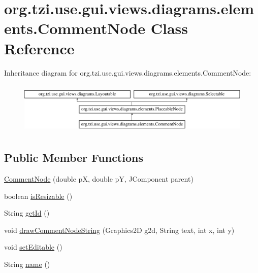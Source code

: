 \hypertarget{classorg_1_1tzi_1_1use_1_1gui_1_1views_1_1diagrams_1_1elements_1_1_comment_node}{\section{org.\-tzi.\-use.\-gui.\-views.\-diagrams.\-elements.\-Comment\-Node Class Reference}
\label{classorg_1_1tzi_1_1use_1_1gui_1_1views_1_1diagrams_1_1elements_1_1_comment_node}
}
Inheritance diagram for org.\-tzi.\-use.\-gui.\-views.\-diagrams.\-elements.\-Comment\-Node\-:\begin{figure}[H]
\begin{center}
\leavevmode
\includegraphics[height=2.514970cm]{classorg_1_1tzi_1_1use_1_1gui_1_1views_1_1diagrams_1_1elements_1_1_comment_node}
\end{center}
\end{figure}
\subsection*{Public Member Functions}
\begin{DoxyCompactItemize}
\item 
\hyperlink{classorg_1_1tzi_1_1use_1_1gui_1_1views_1_1diagrams_1_1elements_1_1_comment_node_a2b20dde2c1b53a5c285973fa010b5764}{Comment\-Node} (double p\-X, double p\-Y, J\-Component parent)
\item 
boolean \hyperlink{classorg_1_1tzi_1_1use_1_1gui_1_1views_1_1diagrams_1_1elements_1_1_comment_node_a86b003a9e8d7471ae8d7cb3e4f0e4b09}{is\-Resizable} ()
\item 
String \hyperlink{classorg_1_1tzi_1_1use_1_1gui_1_1views_1_1diagrams_1_1elements_1_1_comment_node_a4e5f78dde21d3423c2b0ba9c1d3b63ff}{get\-Id} ()
\item 
void \hyperlink{classorg_1_1tzi_1_1use_1_1gui_1_1views_1_1diagrams_1_1elements_1_1_comment_node_abafe10b6a09c14e26886efa074008034}{draw\-Comment\-Node\-String} (Graphics2\-D g2d, String text, int x, int y)
\item 
void \hyperlink{classorg_1_1tzi_1_1use_1_1gui_1_1views_1_1diagrams_1_1elements_1_1_comment_node_a492e9522ce38b20de187941b31f528b8}{set\-Editable} ()
\item 
String \hyperlink{classorg_1_1tzi_1_1use_1_1gui_1_1views_1_1diagrams_1_1elements_1_1_comment_node_a30d5dd6d6d97d9e61bdb58c976642448}{name} ()
\end{DoxyCompactItemize}
